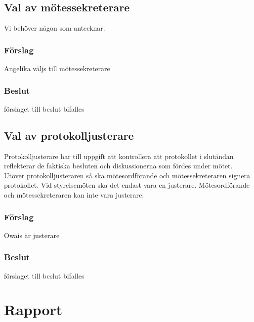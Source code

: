 \documentclass[protokoll]{dvd}
\begin{document}
\subsection{Val av mötessekreterare}
Vi behöver någon som antecknar. 

\subsubsection*{Förslag}
\begin{attsatser}
    \item Angelika väljs till mötessekreterare
\end{attsatser}
\subsubsection*{Beslut}
\begin{attsatser}
    \item förslaget till beslut bifalles
\end{attsatser}

\subsection{Val av protokolljusterare}

Protokolljusterare har till uppgift att kontrollera att protokollet i slutändan reflekterar de faktiska besluten och diskussionerna som fördes under mötet.
Utöver protokolljusteraren så ska mötesordförande och mötessekreteraren signera protokollet.
Vid styrelsemöten ska det endast vara en justerare.
Mötesordförande och mötessekreteraren kan inte vara justerare.

\subsubsection*{Förslag}
\begin{attsatser}
    \item Owais är justerare
\end{attsatser}
\subsubsection*{Beslut}
\begin{attsatser}
    \item förslaget till beslut bifalles
\end{attsatser}

\section{Rapport} 
\end{document}
